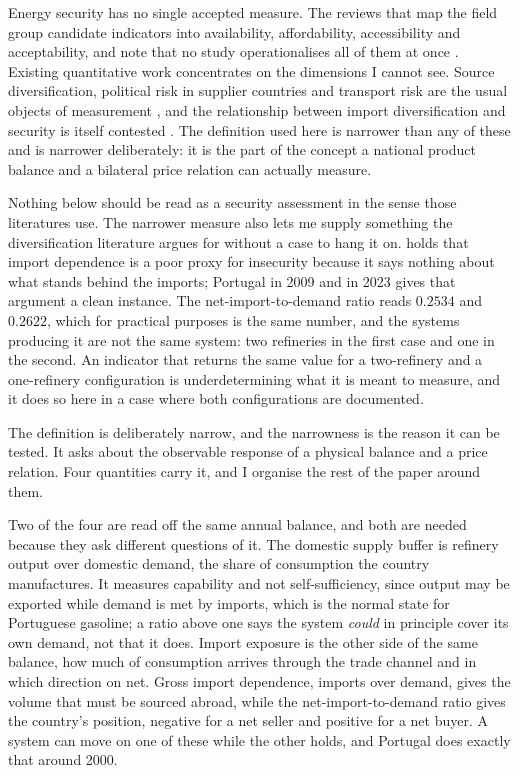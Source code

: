 \documentclass[11pt,a4paper]{article}
\begin{document}
Energy security has no single accepted measure. The reviews that map the field group candidate
indicators into availability, affordability, accessibility and acceptability, and note that no
study operationalises all of them at once \citep{kruyt2009indicators, ang2015energysecurity}.
Existing quantitative work concentrates on the dimensions I cannot see. Source diversification,
political risk in supplier countries and transport risk are the usual objects of measurement
\citep{cohen2011measuring, stirling1998diversity}, and the relationship between import
diversification and security is itself contested \citep{vivoda2009diversification}. The
definition used here is narrower than any of these and is narrower deliberately: it is the part
of the concept a national product balance and a bilateral price relation can actually measure.

Nothing below should be read as a security assessment in the sense those literatures use. The
narrower measure also lets me supply something the diversification literature argues for without
a case to hang it on. \citet{vivoda2009diversification} holds that import dependence is a poor
proxy for insecurity because it says nothing about what stands behind the imports; Portugal in
2009 and in 2023 gives that argument a clean instance. The net-import-to-demand ratio reads
$0.2534$ and $0.2622$, which for practical purposes is the same number, and the systems
producing it are not the same system: two refineries in the first case and one in the second. An
indicator that returns the same value for a two-refinery and a one-refinery configuration is
underdetermining what it is meant to measure, and it does so here in a case where both
configurations are documented.

The definition is deliberately narrow, and the narrowness is the reason it can be tested. It
asks about the observable response of a physical balance and a price relation. Four quantities
carry it, and I organise the rest of the paper around them.

Two of the four are read off the same annual balance, and both are needed because they ask
different questions of it. The domestic supply buffer is refinery output over domestic demand,
the share of consumption the country manufactures. It measures capability and not self-sufficiency,
since output may be exported while demand is met by imports, which is the normal
state for Portuguese gasoline; a ratio above one says the system \emph{could} in principle cover
its own demand, not that it does. Import exposure is the other side of the same balance, how
much of consumption arrives through the trade channel and in which direction on net. Gross
import dependence, imports over demand, gives the volume that must be sourced abroad, while the
net-import-to-demand ratio gives the country's position, negative for a net seller and positive
for a net buyer. A system can move on one of these while the other holds, and Portugal does
exactly that around 2000.
\end{document}
